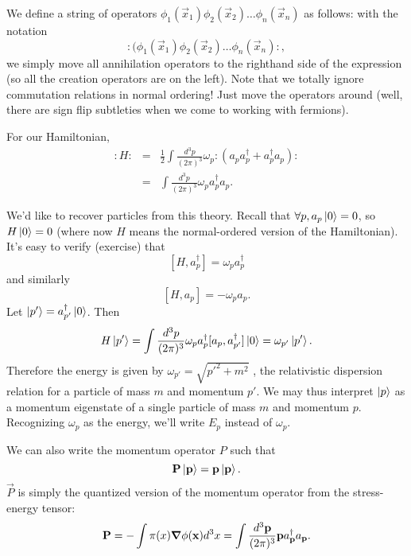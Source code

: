 \begin{defn}
We define a  string of operators $\phi_1(\vec x_1)\phi_2 (\vec x_2)\ldots \phi_n (\vec x_n)$ as follows:
with the notation
$$:(\phi_1(\vec x_1)\phi_2 (\vec x_2)\ldots \phi_n (\vec x_n):,$$
we simply move all annihilation operators to the righthand side of the expression (so all the creation operators are on the left). Note that we totally ignore commutation relations in normal ordering! Just move the operators around (well, there are sign flip subtleties when we come to working with fermions).

\end{defn}
\begin{exm}
For our Hamiltonian,
\begin{eqnarray*}
:H:&=& \frac{1}{2} \int \frac{d^3p}{(2\pi)^3} \omega_p :(a_p a_p^\dagger + a_p^\dagger a_p):\\
&=&\int \frac{d^3p}{(2\pi)^3} \omega_p a_p^\dagger a_p.
\end{eqnarray*}
\end{exm}

We'd like to recover particles from this theory. Recall that $\forall p, a_p\left| 0 \right>=0$, so $H\left| 0 \right>=0$ (where now $H$ means the normal-ordered version of the Hamiltonian). It's easy to verify (exercise) that
$$[H,a_p^\dagger] =\omega_p a_p^\dagger$$
and similarly
$$[H,a_p]=-\omega_p a_p.$$
Let $\left| p' \right>=a^\dagger_{p'}\left| 0 \right>$. Then
$$H\left| p' \right>=\int \frac{d^3 p}{(2\pi)^3} \omega_p a_p^\dagger [a_p, a_{p'}^\dagger]\left| 0 \right>=\omega_{p'}\left| p' \right>.$$
Therefore the energy is given by $\omega_{p'}=\sqrt{{p'}^2+m^2}$ , the relativistic dispersion relation for a particle of mass $m$ and momentum $p'$. We may thus interpret $\left| p \right>$ as a momentum eigenstate of a single particle of mass $m$ and momentum $p$. Recognizing $\omega_p$ as the energy, we'll write $E_p$ instead of $\omega_p$.

We can also write the momentum operator $P$ such that
$$\boldsymbol{\mathbf{P}}\left| \boldsymbol{\mathbf{p}} \right>=\boldsymbol{\mathbf{p}}\left| \boldsymbol{\mathbf{p}} \right>.$$
$\vec P$ is simply the quantized version of the momentum operator from the stress-energy tensor:
$$\boldsymbol{\mathbf{P}} =-\int \pi(x) \mbox{\boldmath$ \nabla $} \phi(\boldsymbol{\mathbf{x}})d^3 x=\int \frac{d^3 \boldsymbol{\mathbf{p}}}{(2\pi)^3} \boldsymbol{\mathbf{p}} a^\dagger_{\boldsymbol{\mathbf{p}}}a _{\boldsymbol{\mathbf{p}}}.$$